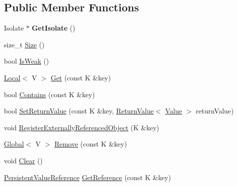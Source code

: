 \subsection*{Public Member Functions}
\begin{DoxyCompactItemize}
\item 
\mbox{\label{classv8_1_1PersistentValueMapBase_a80da7adc6e8bdb166912075346116978}} 
Isolate $\ast$ {\bfseries Get\+Isolate} ()
\item 
size\+\_\+t \mbox{\hyperlink{classv8_1_1PersistentValueMapBase_ade5c5db2a968fdabe073649e85b837eb}{Size}} ()
\item 
bool \mbox{\hyperlink{classv8_1_1PersistentValueMapBase_a9f824b13dd30605589508db2740dd678}{Is\+Weak}} ()
\item 
\mbox{\hyperlink{classv8_1_1Local}{Local}}$<$ V $>$ \mbox{\hyperlink{classv8_1_1PersistentValueMapBase_a16b8f906ea42036c2f37d44813bf2a72}{Get}} (const K \&key)
\item 
bool \mbox{\hyperlink{classv8_1_1PersistentValueMapBase_a8c68e5f99c4042541c6d32232c97282a}{Contains}} (const K \&key)
\item 
bool \mbox{\hyperlink{classv8_1_1PersistentValueMapBase_a85201649d2bbd0ffdebe8be3d5c6447a}{Set\+Return\+Value}} (const K \&key, \mbox{\hyperlink{classv8_1_1ReturnValue}{Return\+Value}}$<$ \mbox{\hyperlink{classv8_1_1Value}{Value}} $>$ return\+Value)
\item 
void \mbox{\hyperlink{classv8_1_1PersistentValueMapBase_a7d1cd63172b997dfaac9d0f009edd709}{Register\+Externally\+Referenced\+Object}} (K \&key)
\item 
\mbox{\hyperlink{classv8_1_1Global}{Global}}$<$ V $>$ \mbox{\hyperlink{classv8_1_1PersistentValueMapBase_abd75a4c050416712167ba0bb9eace097}{Remove}} (const K \&key)
\item 
void \mbox{\hyperlink{classv8_1_1PersistentValueMapBase_a1bf074e7a7c24713c9a3d40ddce89e74}{Clear}} ()
\item 
\mbox{\hyperlink{classv8_1_1PersistentValueMapBase_1_1PersistentValueReference}{Persistent\+Value\+Reference}} \mbox{\hyperlink{classv8_1_1PersistentValueMapBase_a52e74c69b94c7ce77a65af9f32d68af4}{Get\+Reference}} (const K \&key)
\end{DoxyCompactItemize}
